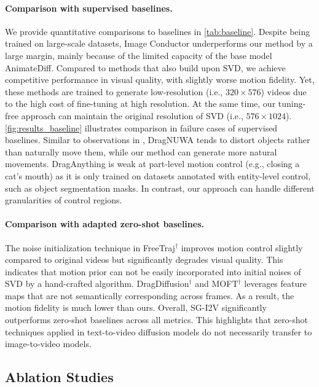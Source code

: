\documentclass{article} \usepackage{iclr2025_conference,times}
\begin{document}
\paragraph{Comparison with supervised baselines.}
We provide quantitative comparisons to baselines in \cref{tab:baseline}.
Despite being trained on large-scale datasets, Image Conductor underperforms our method by a large margin, mainly because of the limited capacity of the base model AnimateDiff.
Compared to methods that also build upon SVD, we achieve competitive performance in visual quality, with slightly worse motion fidelity.
Yet, these methods are trained to generate low-resolution (i.e., $320 \times 576$) videos due to the high cost of fine-tuning at high resolution. At the same time, our tuning-free approach can maintain the original resolution of SVD (i.e., $576 \times 1024$).
\cref{fig:results_baseline} illustrates comparison in failure cases of supervised baselines.
Similar to observations in \citep{wu2024draganything}, DragNUWA tends to distort objects rather than naturally move them, while our method can generate more natural movements. 
DragAnything is weak at part-level motion control (e.g., closing a cat's mouth) as it is only trained on datasets annotated with entity-level control, such as object segmentation masks.
In contrast, our approach can handle different granularities of control regions.


\vspace{-2.0mm}
\paragraph{Comparison with adapted zero-shot baselines.}
The noise initialization technique in FreeTraj$^\dagger$ improves motion control slightly compared to original videos but significantly degrades visual quality. This indicates that motion prior can not be easily incorporated into initial noises of SVD by a hand-crafted algorithm. 
DragDiffusion$^\dagger$ and MOFT$^\dagger$ leverages feature maps that are not semantically corresponding across frames.
As a result, the motion fidelity is much lower than ours.
Overall, SG-I2V significantly outperforms zero-shot baselines across all metrics.
This highlights that zero-shot techniques applied in text-to-video diffusion models do not necessarily transfer to image-to-video models.


\subsection{Ablation Studies}
\label{sec:ablation}
\end{document}
